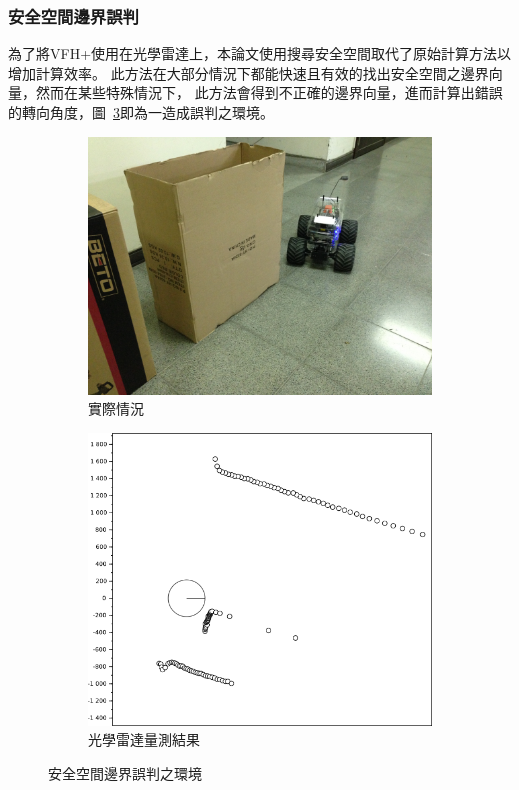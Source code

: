 \subsubsection{安全空間邊界誤判}
為了將VFH+使用在光學雷達上，本論文使用搜尋安全空間取代了原始計算方法以增加計算效率。
此方法在大部分情況下都能快速且有效的找出安全空間之邊界向量，然而在某些特殊情況下，
此方法會得到不正確的邊界向量，進而計算出錯誤的轉向角度，圖~\ref{f:wrong_boundary}即為一造成誤判之環境。
\begin{figure}[h!]
	\centering
	\begin{subfigure}[t]{0.51\textwidth}
		\includegraphics[width=\textwidth]{figures/algorithm/wrong_boundary_real}
		\caption{實際情況}
		\label{f:wrong_boundary_real}
	\end{subfigure}
	\begin{subfigure}[t]{0.45\textwidth}
		\includegraphics[width=\textwidth]{figures/algorithm/wrong_boundary}
		\caption{光學雷達量測結果}
		\label{f:wrong_boundary_m}
	\end{subfigure}
	\caption{安全空間邊界誤判之環境}
	\label{f:wrong_boundary}
\end{figure}


